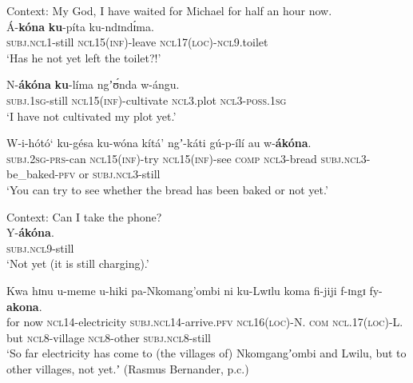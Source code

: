 \begin{exe}
	\ex\label{exAppendixMandaNotYet1}
	Context: My God, I have waited for Michael for half an hour now.\\
	\gll Á-\textbf{kóna} \textbf{ku}-píta ku-ndɪndɪ́ma.\\
	\textsc{subj}.\textsc{ncl}1-still \textsc{ncl}15(\textsc{inf})-leave \textsc{ncl}17(\textsc{loc})-\textsc{ncl}9.toilet\\
	\glt \lq Has he not yet left the toilet?!' \parencite[54]{Bernander2021}
	
	\ex\label{exAppendixMandaNotYet2}
	\gll N-\textbf{ákóna} \textbf{ku}-líma ngʼʊ́nda w-ángu.\\
	\textsc{subj}.1\textsc{sg}-still \textsc{ncl}15(\textsc{inf})-cultivate \textsc{ncl}3.plot \textsc{ncl}3-\textsc{poss}.1\textsc{sg}\\
	\glt \lq I have not cultivated my plot yet.' \parencite[45]{Bernander2021}
		
	\ex\label{exAppendixMandaNotYet3}
	\gll W-i-hótó‘ ku-gésa ku-wóna kítá' ngʼ-káti gú-p-ílí au w-\textbf{ákóna}.\\
	\textsc{subj}.2\textsc{sg}-\textsc{prs}-can \textsc{ncl}15(\textsc{inf})-try \textsc{ncl}15(\textsc{inf})-see \textsc{comp} \textsc{ncl}3-bread \textsc{subj}.\textsc{ncl}3-be\_baked-\textsc{pfv} or \textsc{subj}.\textsc{ncl3}-still\\
	\glt \lq You can try to see whether the bread has been baked or not yet.' \parencite[265]{Bernander2017}
		
	\ex\label{exAppendixMandaNotYet4}	
	Context: Can I take the phone?\\
	\gll Y-\textbf{ákóna}.\\
	\textsc{subj}.\textsc{ncl9}-still\\
	\glt \lq Not yet (it is still charging).' \parencite[265]{Bernander2017}
	
	\ex\label{exAppendixMandaNotYet5}
	\gll Kwa hɪnu u-meme u-hiki pa-Nkomang'ombi ni ku-Lwɪlu koma fi-jiji f-ɪngɪ fy-\textbf{akona}.\\
	for now \textsc{ncl}14-electricity \textsc{subj}.\textsc{ncl}14-arrive.\textsc{pfv} \textsc{ncl}16(\textsc{loc})-N. \textsc{com} \textsc{ncl}.17(\textsc{loc})-L. but \textsc{ncl}8-village \textsc{ncl}8-other \textsc{subj}.\textsc{ncl}8-still\\
	\glt \lq So far electricity has come to (the villages of) Nkomgangʼombi and Lwilu, but to other villages, not yet.ʼ (Rasmus Bernander, p.c.)
\end{exe}

